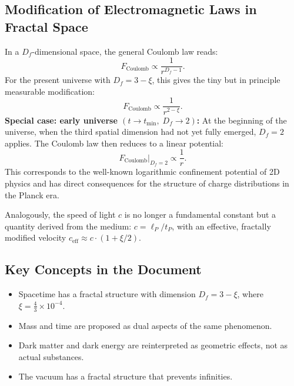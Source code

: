 	\subsection{Modification of Electromagnetic Laws in Fractal Space}
	In a \(D_f\)-dimensional space, the general Coulomb law reads:
	\begin{equation}
		F_{\text{Coulomb}} \propto \frac{1}{r^{D_f - 1}}.
		\label{eq:fractal_coulomb_general}
	\end{equation}
	For the present universe with \(D_f = 3-\xi\), this gives the tiny but in principle measurable modification:
	\begin{equation}
		F_{\text{Coulomb}} \propto \frac{1}{r^{2 - \xi}}.
		\label{eq:fractal_coulomb}
	\end{equation}
	\textbf{Special case: early universe \((t \to t_{\min},\; D_f \to 2)\):}
	At the beginning of the universe, when the third spatial dimension had not yet fully emerged, \(D_f = 2\) applies. The Coulomb law then reduces to a linear potential:
	\begin{equation}
		F_{\text{Coulomb}}\big|_{D_f=2} \propto \frac{1}{r}.
		\label{eq:coulomb_df2}
	\end{equation}
	This corresponds to the well-known logarithmic confinement potential of 2D physics and has direct consequences for the structure of charge distributions in the Planck era.

	Analogously, the speed of light \(c\) is no longer a fundamental constant but a quantity derived from the medium: \(c = \ell_P / t_P\), with an effective, fractally modified velocity \(c_{\text{eff}} \approx c \cdot (1 + \xi/2)\).
	
	\subsection{Key Concepts in the Document}
	\begin{itemize}
		\item Spacetime has a fractal structure with dimension \( D_f = 3 - \xi \), where \( \xi = \frac{4}{3} \times 10^{-4} \).
		\item Mass and time are proposed as dual aspects of the same phenomenon.
		\item Dark matter and dark energy are reinterpreted as geometric effects, not as actual substances.
		\item The vacuum has a fractal structure that prevents infinities.
	\end{itemize}
	
